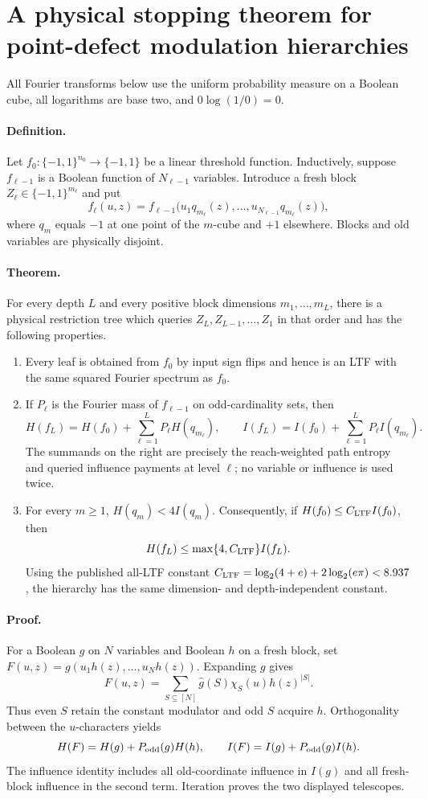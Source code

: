 \section*{A physical stopping theorem for point-defect modulation hierarchies}

All Fourier transforms below use the uniform probability measure on a
Boolean cube, all logarithms are base two, and $0\log(1/0)=0$.

\paragraph{Definition.}
Let $f_0:\{-1,1\}^{n_0}\to\{-1,1\}$ be a linear threshold function.
Inductively, suppose $f_{\ell-1}$ is a Boolean function of $N_{\ell-1}$
variables.  Introduce a fresh block $Z_\ell\in\{-1,1\}^{m_\ell}$ and put
\[
 f_\ell(u,z)=f_{\ell-1}
 \bigl(u_1q_{m_\ell}(z),\ldots,
       u_{N_{\ell-1}}q_{m_\ell}(z)\bigr),
\]
where $q_m$ equals $-1$ at one point of the $m$-cube and $+1$ elsewhere.
Blocks and old variables are physically disjoint.

\paragraph{Theorem.}
For every depth $L$ and every positive block dimensions $m_1,\ldots,m_L$,
there is a physical restriction tree which queries $Z_L,Z_{L-1},\ldots,Z_1$
in that order and has the following properties.
\begin{enumerate}
\item Every leaf is obtained from $f_0$ by input sign flips and hence is an
LTF with the same squared Fourier spectrum as $f_0$.
\item If $P_\ell$ is the Fourier mass of $f_{\ell-1}$ on odd-cardinality
sets, then
\[
 H(f_L)=H(f_0)+\sum_{\ell=1}^L P_\ell H(q_{m_\ell}),\qquad
 I(f_L)=I(f_0)+\sum_{\ell=1}^L P_\ell I(q_{m_\ell}).
\]
The summands on the right are precisely the reach-weighted path entropy and
queried influence payments at level $\ell$; no variable or influence is used
twice.
\item For every $m\ge1$, $H(q_m)<4I(q_m)$.  Consequently, if
$H(f_0)\le C_{\rm LTF}I(f_0)$, then
\[
 H(f_L)\le \max\{4,C_{\rm LTF}\}I(f_L).
\]
Using the published all-LTF constant
$C_{\rm LTF}=\log_2(4+e)+2\log_2(e\pi)<8.937$, the hierarchy has the same
dimension- and depth-independent constant.
\end{enumerate}

\paragraph{Proof.}
For a Boolean $g$ on $N$ variables and Boolean $h$ on a fresh block, set
$F(u,z)=g(u_1h(z),\ldots,u_Nh(z))$.  Expanding $g$ gives
\[
 F(u,z)=\sum_{S\subseteq[N]}\widehat g(S)\chi_S(u)h(z)^{|S|}.
\]
Thus even $S$ retain the constant modulator and odd $S$ acquire $h$.
Orthogonality between the $u$-characters yields
\[
 H(F)=H(g)+P_{\rm odd}(g)H(h),\qquad
 I(F)=I(g)+P_{\rm odd}(g)I(h).
\]
The influence identity includes all old-coordinate influence in $I(g)$ and
all fresh-block influence in the second term.  Iteration proves the two
displayed telescopes.

